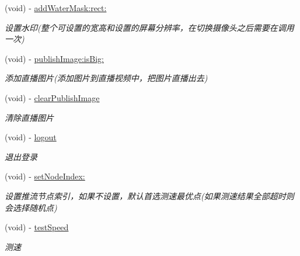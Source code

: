 \begin{DoxyCompactItemize}
(void) -\/ \hyperlink{interface_c_c_push_util_ac6be9fb2ae7ecd8370ebe7f918aa4685}{add\+Water\+Mask\+:rect\+:}
\begin{DoxyCompactList}\small\item\em 设置水印(整个可设置的宽高和设置的屏幕分辨率，在切换摄像头之后需要在调用一次) \end{DoxyCompactList}\item 
(void) -\/ \hyperlink{interface_c_c_push_util_abeb3c0560246853b40729b3e091ef988}{publish\+Image\+:is\+Big\+:}
\begin{DoxyCompactList}\small\item\em 添加直播图片(添加图片到直播视频中，把图片直播出去) \end{DoxyCompactList}\item 
\mbox{\label{interface_c_c_push_util_a1664d1e5d4b51a848f527a727430a422}} 
(void) -\/ \hyperlink{interface_c_c_push_util_a1664d1e5d4b51a848f527a727430a422}{clear\+Publish\+Image}
\begin{DoxyCompactList}\small\item\em 清除直播图片 \end{DoxyCompactList}\item 
\mbox{\label{interface_c_c_push_util_a91923b69cfb10c3dc40d247fdbb6fa45}} 
(void) -\/ \hyperlink{interface_c_c_push_util_a91923b69cfb10c3dc40d247fdbb6fa45}{logout}
\begin{DoxyCompactList}\small\item\em 退出登录 \end{DoxyCompactList}\item 
(void) -\/ \hyperlink{interface_c_c_push_util_a5c4bc7eedd825fb399b1c0e77a3b7878}{set\+Node\+Index\+:}
\begin{DoxyCompactList}\small\item\em 设置推流节点索引，如果不设置，默认首选测速最优点(如果测速结果全部超时则会选择随机点) \end{DoxyCompactList}\item 
\mbox{\label{interface_c_c_push_util_af7ad905ef9bfe2cee2631f9ca3343559}} 
(void) -\/ \hyperlink{interface_c_c_push_util_af7ad905ef9bfe2cee2631f9ca3343559}{test\+Speed}
\begin{DoxyCompactList}\small\item\em 测速 \end{DoxyCompactList}\item 

\end{DoxyCompactItemize}
